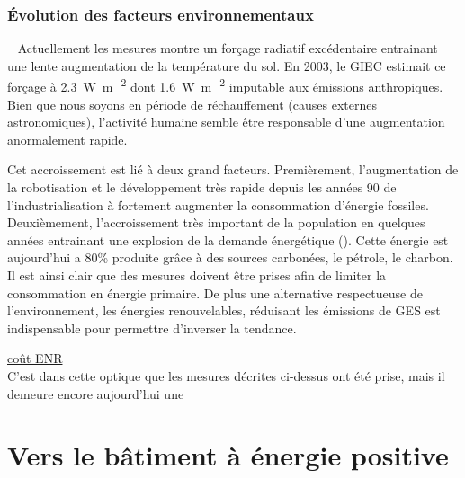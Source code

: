 \subsubsection{Évolution des facteurs environnementaux} %
\label{ssub:evolution_des_facteurs_environnementaux}
~
Actuellement les mesures montre un forçage radiatif excédentaire entrainant une
lente augmentation de la température du sol. En 2003, le GIEC estimait ce forçage
à \SI{2.3}{\watt\per\metre\squared} dont \SI{1.6}{\watt\per\metre\squared} imputable
aux émissions anthropiques. Bien que nous soyons en période de réchauffement
(causes externes astronomiques), l’activité humaine semble être responsable d’une
augmentation anormalement rapide.


Cet accroissement est lié à deux grand facteurs. Premièrement, l’augmentation de la robotisation
et le développement très rapide depuis les années 90 de l’industrialisation à fortement
augmenter la consommation d’énergie fossiles. Deuxièmement, l’accroissement très important
de la population en quelques années entrainant une explosion de la demande énergétique
(). Cette énergie est aujourd’hui a 80\% produite grâce à des sources
carbonées, le pétrole, le charbon. Il est ainsi clair que des mesures doivent être
prises afin de limiter la consommation en énergie primaire. De plus une alternative
respectueuse de l’environnement, les énergies renouvelables, réduisant les émissions de
GES est indispensable pour permettre d’inverser la tendance.

\href{http://decrypterlenergie.org/les-energies-renouvelables-coutent-elles-trop-cher}{coût ENR}\\
C’est dans cette optique que les mesures décrites ci-dessus ont été prise, mais
il demeure encore aujourd’hui une






\section{Vers le bâtiment à énergie positive} %
\label{sec:vers_le_batiment_a_energie_positive}
